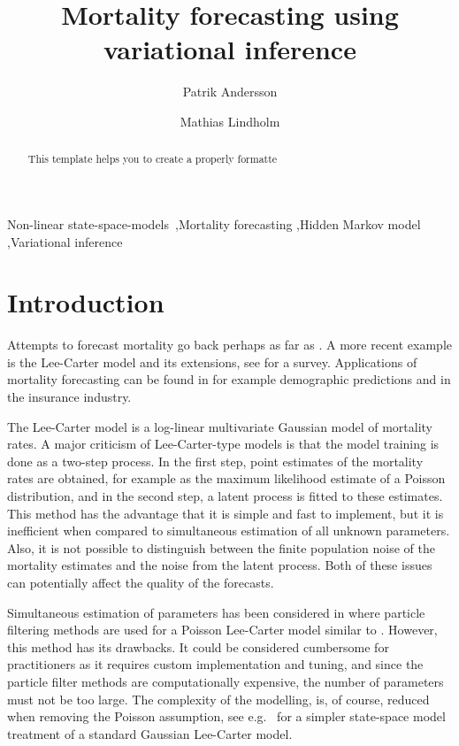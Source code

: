 \documentclass[preprint,12pt]{elsarticle}
\begin{document}
\begin{frontmatter}

\title{Mortality forecasting using variational inference}
\author{Patrik Andersson}
\address{Uppsala University}
\author{Mathias Lindholm}
\address{Stockholm University}

\begin{abstract}
This template helps you to create a properly formatte
\end{abstract}

\begin{keyword}
Non-linear state-space-models \sep Mortality forecasting \sep Hidden Markov model \sep Variational inference
\end{keyword}

\end{frontmatter}

\linenumbers

\section{Introduction}
Attempts to forecast mortality go back perhaps as far as \cite{gompertz1825nature}. A more recent example is the Lee-Carter model \citep{lee1992modeling} and its extensions, see \cite{booth2008mortality, haberman2011comparative, carfora2017quantitative} for a survey. Applications of mortality forecasting can be found in for example demographic predictions and in the insurance industry.

The Lee-Carter model is a log-linear multivariate Gaussian model of mortality rates. A major criticism of Lee-Carter-type models is that the model training is done as a two-step process. In the first step, point estimates of the mortality rates are obtained, for example as the maximum likelihood estimate of a Poisson distribution, and in the second step, a latent process is fitted to these estimates. This method has the advantage that it is simple and fast to implement, but it is inefficient when compared to simultaneous estimation of all unknown parameters. Also, it is not possible to distinguish between the finite population noise of the mortality estimates and the noise from the latent process. Both of these issues can potentially affect the quality of the forecasts. 

Simultaneous estimation of parameters has been considered in \cite{andersson2020mortality} where particle filtering methods are used for a Poisson Lee-Carter model similar to \cite{brouhns2002poisson}. However, this method has its drawbacks. It could be considered cumbersome for practitioners as it requires custom implementation and tuning, and since the particle filter methods are computationally expensive, the number of parameters must not be too large. The complexity of the modelling, is, of course, reduced when removing the Poisson assumption, see e.g.\ \cite{de2006extending} for a simpler state-space model treatment of a standard Gaussian Lee-Carter model.
\end{document}
